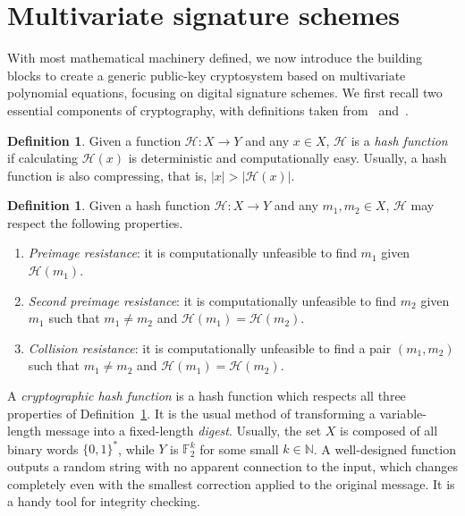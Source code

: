 \documentclass[english]{ufsc-thesis-rn46-2019/ufsc-thesis-rn46-2019}
\theoremstyle{definition}
\newtheorem{definition}[theorem]{Definition}
\begin{document}
\section{Multivariate signature schemes}\label{sec:mult}

With most mathematical machinery defined, we now introduce the building blocks
to create a generic public-key cryptosystem based on multivariate polynomial
equations, focusing on digital signature schemes. We first recall two essential
components of cryptography, with definitions taken
from~\cite[Sec.~7.1]{Gathen:2015} and~\cite[Sec.~6.1]{Goldreich:2004}.

\begin{definition}
  Given a function $\mathcal{H} : X \to Y$ and any $x \in X$, $\mathcal{H}$ is
  a \emph{hash function} if calculating $\mathcal{H}(x)$ is deterministic and
  computationally easy. Usually, a hash function is also compressing, that
  is, $|x| > |\mathcal{H}(x)|$.
\end{definition}

\begin{definition}\label{def:hash}
  Given a hash function $\mathcal{H} : X \to Y$ and any $m_{1}, m_{2} \in X$,
  $\mathcal{H}$ may respect the following properties.

  \begin{enumerate}
    \item \emph{Preimage resistance}: it is computationally unfeasible to find
      $m_{1}$ given $\mathcal{H}(m_{1})$.
    \item \emph{Second preimage resistance}: it is computationally unfeasible
      to find $m_{2}$ given $m_{1}$ such that $m_{1} \neq m_{2}$ and
      $\mathcal{H}(m_{1}) = \mathcal{H}(m_{2})$.
    \item \emph{Collision resistance}: it is computationally unfeasible to find
      a pair $(m_{1}, m_{2})$ such that $m_{1} \neq m_{2}$ and
      $\mathcal{H}(m_{1}) = \mathcal{H}(m_{2})$.
  \end{enumerate}
\end{definition}

A \emph{cryptographic hash function} is a hash function which respects all
three properties of Definition~\ref{def:hash}. It is the usual method of
transforming a variable-length message into a fixed-length
\emph{digest}. Usually, the set $X$ is composed of all binary words
${\{0, 1\}}^{*}$, while $Y$ is $\mathbb{F}_{2}^{k}$ for some small
$k \in \mathbb{N}$. A well-designed function outputs a random string with no
apparent connection to the input, which changes completely even with the
smallest correction applied to the original message. It is a handy tool for
integrity checking.
\end{document}
